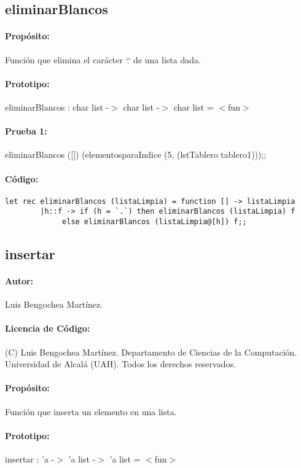 \subsection{eliminarBlancos}

\paragraph{Propósito:} Función que elimina el carácter `.` de una lista dada.
\paragraph{Prototipo:} eliminarBlancos : char list -$>$ char list -$>$ char list = $<$fun$>$
\paragraph{Prueba 1:} eliminarBlancos ([]) (elementosparaIndice (5, (lstTablero
tablero1)));;
\paragraph{Código:}
\begin{verbatim}
let rec eliminarBlancos (listaLimpia) = function [] -> listaLimpia
		|h::f -> if (h = `.`) then eliminarBlancos (listaLimpia) f
			 else eliminarBlancos (listaLimpia@[h]) f;;
\end{verbatim}

\subsection{insertar}

\paragraph{Autor:} Luis Bengochea Martínez.
\paragraph{Licencia de Código:} (C) Luis Bengochea Martínez. Departamento de Ciencias de la
Computación. Universidad de Alcalá (UAH). Todos los derechos reservados.
\paragraph{Propósito:} Función que inserta un elemento en una lista.
\paragraph{Prototipo:} insertar : 'a -$>$ 'a list -$>$ 'a list = $<$fun$>$
